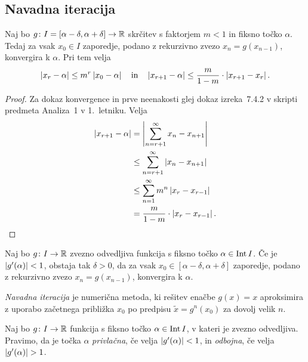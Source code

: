 \newpage

\subsection{Navadna iteracija}

\begin{izrek}
Naj bo $g \colon I = [\alpha - \delta, \alpha + \delta] \to \mathbb{R}$
skrčitev s faktorjem $m < 1$ in fiksno točko $\alpha$. Tedaj za
vsak $x_0 \in I$ zaporedje, podano z rekurzivno zvezo
$x_n = g(x_{n-1})$, konvergira k $\alpha$. Pri tem velja
\[
\left\lvert x_r - \alpha\right\rvert \leq m^r \left\lvert x_0 - \alpha\right\rvert
\quad \text{in} \quad
\left\lvert x_{r+1} - \alpha\right\rvert \leq
\frac{m}{1-m} \cdot \left\lvert x_{r+1} - x_r\right\rvert.
\]
\end{izrek}

\begin{proof}
Za dokaz konvergence in prve neenakosti glej dokaz izreka~7.4.2 v
skripti predmeta Analiza~1 v 1.~letniku. Velja
\begin{align*}
\left\lvert x_{r+1} - \alpha\right\rvert &=
\left\lvert \sum_{n=r+1}^\infty x_n - x_{n+1}\right\rvert
\\
&\leq
\sum_{n=r+1}^\infty \left\lvert x_n - x_{n+1}\right\rvert
\\
&\leq
\sum_{n=1}^\infty m^n \left\lvert x_r - x_{r-1}\right\rvert
\\
&=
\frac{m}{1-m} \cdot \left\lvert x_r - x_{r-1}\right\rvert. \qedhere
\end{align*}
\end{proof}

\begin{posledica}
Naj bo $g \colon I \to \mathbb{R}$ zvezno odvedljiva funkcija s fiksno
točko $\alpha \in \operatorname{Int} I$. Če je $\left\lvert g'(\alpha)\right\rvert < 1$, obstaja
tak $\delta > 0$, da za vsak
$x_0 \in [\alpha - \delta, \alpha + \delta]$ zaporedje, podano z
rekurzivno zvezo $x_n = g(x_{n-1})$, konvergira k $\alpha$.
\end{posledica}

\obvs

\begin{definicija}
\emph{Navadna iteracija}
je numerična metoda, ki rešitev enačbe $g(x) = x$ aproksimira z
uporabo začetnega približka $x_0$ po predpisu
$\widetilde{x} = g^n(x_0)$ za dovolj velik $n$.
\end{definicija}

\begin{definicija}
Naj bo $g \colon I \to \mathbb{R}$ funkcija s fiksno točko
$\alpha \in \operatorname{Int} I$, v kateri je zvezno odvedljiva. Pravimo, da je
točka $\alpha$ \emph{privlačna}, če
velja $\left\lvert g'(\alpha)\right\rvert < 1$, in \emph{odbojna}, če velja
$\left\lvert g'(\alpha)\right\rvert > 1$.
\end{definicija}

